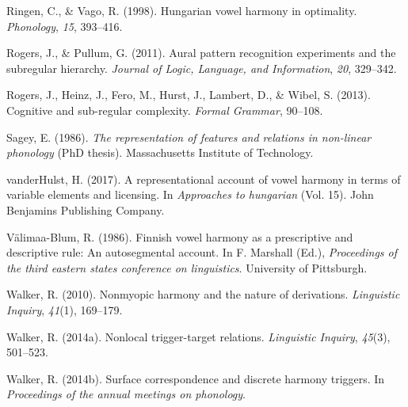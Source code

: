 \documentclass[floatsintext,man]{apa6}
\theoremstyle{definition}
\theoremstyle{definition}
\theoremstyle{definition}
\theoremstyle{remark}
\begin{document}
\hypertarget{ref-ringenvago1998}{}
Ringen, C., \& Vago, R. (1998). Hungarian vowel harmony in optimality.
\emph{Phonology}, \emph{15}, 393--416.

\hypertarget{ref-rogerspullum2011}{}
Rogers, J., \& Pullum, G. (2011). Aural pattern recognition experiments
and the subregular hierarchy. \emph{Journal of Logic, Language, and
Information}, \emph{20}, 329--342.

\hypertarget{ref-rogersetal2013}{}
Rogers, J., Heinz, J., Fero, M., Hurst, J., Lambert, D., \& Wibel, S.
(2013). Cognitive and sub-regular complexity. \emph{Formal Grammar},
90--108.

\hypertarget{ref-sagey1986}{}
Sagey, E. (1986). \emph{The representation of features and relations in
non-linear phonology} (PhD thesis). Massachusetts Institute of
Technology.

\hypertarget{ref-vdHulst2017}{}
vanderHulst, H. (2017). A representational account of vowel harmony in
terms of variable elements and licensing. In \emph{Approaches to
hungarian} (Vol. 15). John Benjamins Publishing Company.

\hypertarget{ref-valimaablum1986}{}
Välimaa-Blum, R. (1986). Finnish vowel harmony as a prescriptive and
descriptive rule: An autosegmental account. In F. Marshall (Ed.),
\emph{Proceedings of the third eastern states conference on
linguistics}. University of Pittsburgh.

\hypertarget{ref-walker2010}{}
Walker, R. (2010). Nonmyopic harmony and the nature of derivations.
\emph{Linguistic Inquiry}, \emph{41}(1), 169--179.

\hypertarget{ref-walkeroroquen}{}
Walker, R. (2014a). Nonlocal trigger-target relations. \emph{Linguistic
Inquiry}, \emph{45}(3), 501--523.

\hypertarget{ref-walker2014}{}
Walker, R. (2014b). Surface correspondence and discrete harmony
triggers. In \emph{Proceedings of the annual meetings on phonology}.
\end{document}
